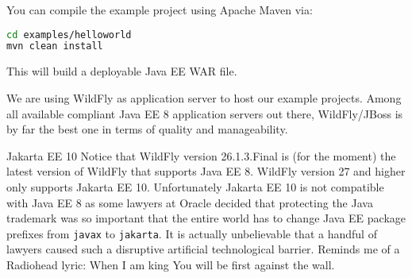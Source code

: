 You can compile the example project using Apache Maven via:
\begin{lstlisting}[language=bash]
cd examples/helloworld
mvn clean install
\end{lstlisting}
This will build a deployable Java EE WAR file.

We are using WildFly \cite{WildFly} as application server to host our example projects.
Among all available compliant Java EE 8 application servers out there,
WildFly/JBoss is by far the best one in terms of quality and manageability.

\begin{ClownComputing}{Jakarta EE 10}
	Notice that WildFly version 26.1.3.Final is (for the moment) the latest version of WildFly that supports Java EE 8.
	WildFly version 27 and higher only supports Jakarta EE 10.
	Unfortunately Jakarta EE 10 is not compatible with Java EE 8 as some lawyers at Oracle decided that protecting the Java trademark was so important that the entire world has to change Java EE package prefixes from \texttt{javax} to \texttt{jakarta}.
	It is actually unbelievable that a handful of lawyers caused such a disruptive artificial technological barrier.
	Reminds me of a Radiohead lyric: When I am king
	You will be first against the wall.
\end{ClownComputing}

